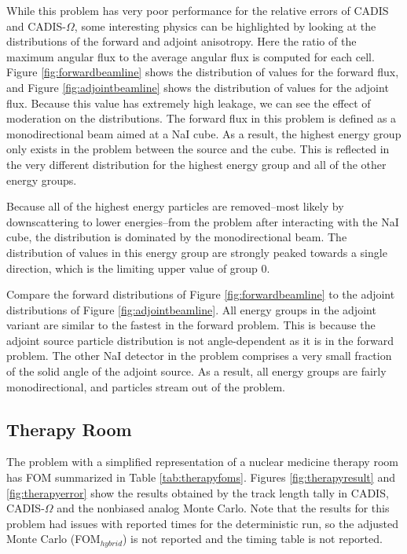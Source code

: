 While this problem has very poor performance for the relative errors of CADIS
and CADIS-$\Omega$, some interesting physics can be highlighted by looking at
the distributions of the forward and adjoint anisotropy. Here the ratio of the
maximum angular flux to the average angular flux is computed for each cell.
Figure \ref{fig:forwardbeamline} shows the distribution of values for the
forward flux, and Figure \ref{fig:adjointbeamline} shows the distribution of
values for the adjoint flux. Because this value has extremely high leakage, we
can see the effect of moderation on the distributions. The forward flux in this
problem is defined as a monodirectional beam aimed at a NaI cube. As a result,
the highest energy group only exists in the problem between the source and the
cube. This is reflected in the very different distribution for the highest
energy group and all of the other energy groups.

Because all of the highest energy particles are removed--most likely by
downscattering to lower energies--from the problem after interacting with the
NaI cube, the distribution is dominated by the monodirectional beam. The
distribution of values in this energy group are strongly peaked towards a single
direction, which is the limiting upper value of group 0.

Compare the forward distributions of Figure \ref{fig:forwardbeamline} to the
adjoint distributions of Figure \ref{fig:adjointbeamline}. All energy groups
in the adjoint variant are similar to the fastest in the forward problem. This
is because the adjoint source particle distribution is not angle-dependent as it
is in the forward problem. The other NaI detector in the problem comprises a very
small fraction of the solid angle of the adjoint source. As a result, all energy
groups are fairly monodirectional, and particles stream out of the problem.

\subsection{Therapy Room}
\label{subsec:resultstherapy}

The problem with a simplified representation of a nuclear medicine therapy room
has FOM summarized in Table
\ref{tab:therapyfoms}. Figures
\ref{fig:therapyresult} and \ref{fig:therapyerror} show the results obtained
by the track length tally in CADIS, CADIS-$\Omega$ and the nonbiased analog
Monte Carlo. Note that the results for this problem had issues with reported
times for the deterministic run, so the adjusted Monte Carlo
(FOM$_{hybrid}$) is not reported and the timing table is not reported.

